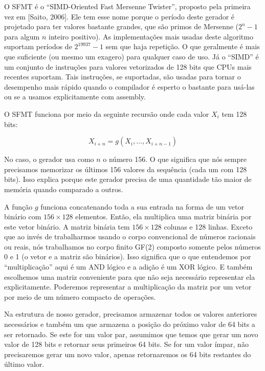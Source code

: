 
O SFMT é o ``SIMD-Oriented Fast Mersenne Twister'', proposto pela
primeira vez em [Saito, 2006]. Ele tem esse nome porque o período
deste gerador é projetado para ter valores bastante grandes, que são
primos de Mersenne ($2^n-1$ para algum $n$ inteiro positivo). As
implementações mais usadas deste algoritmo suportam períodos de
$2^{19937}-1$ sem que haja repetição. O que geralmente é mais que
suficiente (ou mesmo um exagero) para qualquer caso de uso. Já o
``SIMD'' é um conjunto de instruções para valores vetorizados de 128
bits que CPUs mais recentes suportam. Tais instruções, se suportadas,
são usadas para tornar o desempenho mais rápido quando o compilador é
esperto o bastante para usá-las ou se a usamos explicitamente com
assembly.

O SFMT funciona por meio da seguinte recursão onde cada valor $X_i$
tem 128 bits:

$$
X_{i+n}=g(X_i, \ldots, X_{i+n-1})
$$

No caso, o gerador usa como $n$ o número 156. O que significa que nós
sempre precisamos memorizar os últimos 156 valores da sequência (cada
um com 128 bits). Isso explica porque este gerador precisa de uma
quantidade tão maior de memória quando comparado a outros.

A função $g$ funciona concatenando toda a sua entrada na forma de um
vetor binário com $156 \times 128$ elementos. Então, ela multiplica
uma matriz binária por este vetor binário. A matriz binária tem
$156 \times 128$ colunas e 128 linhas. Exceto que ao invés de
trabalharmos usando o corpo convencional de números racionais ou
reais, nós trabalhamos no corpo finito GF(2) composto somente pelos
números 0 e 1 (o vetor e a matriz são binários). Isso significa que o
que entendemos por ``multiplicação'' aqui é um AND lógico e a adição é
um XOR lógico. E também escolhemos uma matriz conveniente para que não
seja necessário representar ela explicitamente. Poderemos representar
a multiplicação da matriz por um vetor por meio de um número compacto
de operações.

Na estrutura de nosso gerador, precisamos armazenar todos os valores
anteriores necessários e também um  que armazena a
posição do próximo valor de 64 bits a ser retornado. Se este for um
valor par, assumimos que temos que gerar um novo valor de 128 bits e
retornar seus primeiros 64 bits. Se for um valor ímpar, não
precisaremos gerar um novo valor, apenas retornaremos os 64 bits
restantes do último valor.

